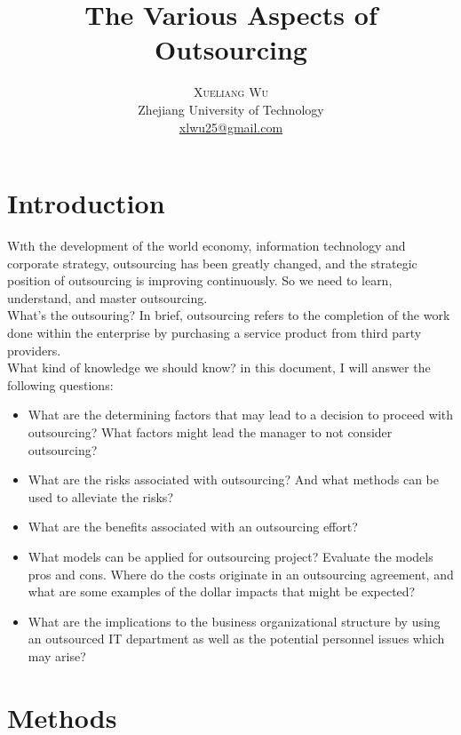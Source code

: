 \documentclass[twocolumn,UTF8]{article}
\title{The Various Aspects of Outsourcing} %
\author{
\textsc{Xueliang Wu}\\[1ex]
\normalsize Zhejiang University of Technology \\
\normalsize \href{mailto:xlwu25@gmail.com}{xlwu25@gmail.com}
}
\begin{document}
\maketitle


\section{Introduction}

\lettrine[nindent=0em,lines=2]{W} ith the development of the world economy, information technology and corporate strategy, outsourcing has been greatly changed, and the strategic position of outsourcing is improving continuously.
So we need to learn, understand, and master outsourcing.\\
What's the outsouring? In brief, outsourcing refers to the completion of the work done within the enterprise by purchasing a service product from third party providers. \\
What kind of knowledge we should know? in this document, I will answer the following questions:
\begin{itemize}
\item What are the determining factors that may lead to a decision to proceed with outsourcing? What factors might lead the manager to not consider outsourcing?
\item What are the risks associated with outsourcing? And what methods can be used to alleviate the risks?
\item What are the benefits associated with an outsourcing effort?
\item What models can be applied for outsourcing project? Evaluate the models pros and cons.
Where do the costs originate in an outsourcing agreement, and what are some examples of the dollar impacts that might be expected?
\item What are the implications to the business organizational structure by using an outsourced IT department as well as the potential personnel issues which may arise?
\end{itemize}


\section{Methods}
\end{document}
